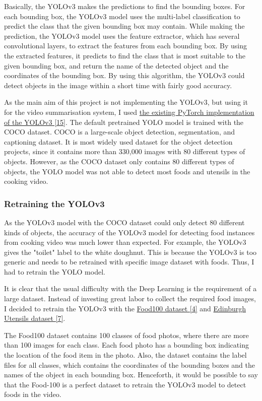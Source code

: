 \documentclass{article}
\begin{document}
Basically, the YOLOv3 makes the predictions to find the bounding boxes. For each bounding box, the YOLOv3 model uses the multi-label classification to predict the class that the given bounding box may contain. While making the prediction, the YOLOv3 model uses the feature extractor, which has several convolutional layers, to extract the features from each bounding box. By using the extracted features, it predicts to find the class that is most suitable to the given bounding box, and return the name of the detected object and the coordinates of the bounding box. By using this algorithm, the YOLOv3 could detect objects in the image within a short time with fairly good accuracy.

As the main aim of this project is not implementing the YOLOv3, but using it for the video summarisation system, I used \hyperlink{ref15}{the existing PyTorch implementation of the YOLOv3 [15]}. The default pretrained YOLO model is trained with the COCO dataset. COCO is a large-scale object detection, segmentation, and captioning dataset. It is most widely used dataset for the object detection projects, since it contains more than 330,000 images with 80 different types of objects. However, as the COCO dataset only contains 80 different types of objects, the YOLO model was not able to detect most foods and utensils in the cooking video.

\subsubsection{Retraining the YOLOv3}

As the YOLOv3 model with the COCO dataset could only detect 80 different kinds of objects, the accuracy of the YOLOv3 model for detecting food instances from cooking video was much lower than expected. For example, the YOLOv3 gives the "toilet" label to the white doughnut. This is because the YOLOv3 is too generic and needs to be retrained with specific image dataset with foods. Thus, I had to retrain the YOLO model.

It is clear that the usual difficulty with the Deep Learning is the requirement of a large dataset. Instead of investing great labor to collect the required food images, I decided to retrain the YOLOv3 with the \hyperlink{ref4}{Food100 dataset [4]} and \hyperlink{ref7}{Edinburgh Utensils dataset [7]}.

The Food100 dataset contains 100 classes of food photos, where there are more than 100 images for each class. Each food photo has a bounding box indicating the location of the food item in the photo. Also, the dataset contains the label files for all classes, which contains the coordinates of the bounding boxes and the names of the object in each bounding box. Henceforth, it would be possible to say that the Food-100 is a perfect dataset to retrain the YOLOv3 model to detect foods in the video.
\end{document}
